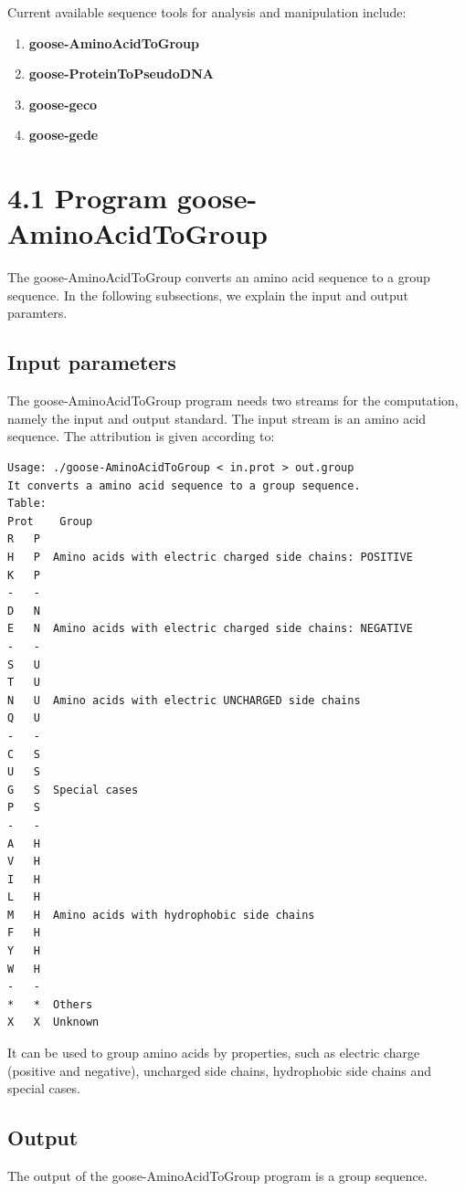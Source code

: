 \documentclass[11pt,journal,compsoc]{report}[1]
\begin{document}
Current available sequence tools for analysis and manipulation include:
\begin{enumerate}
\item \textbf{goose-AminoAcidToGroup}
\item \textbf{goose-ProteinToPseudoDNA}
\item \textbf{goose-geco}
\item \textbf{goose-gede}
\end{enumerate}

\section*{4.1 Program goose-AminoAcidToGroup}

The goose-AminoAcidToGroup converts an amino acid sequence to a group sequence.
In the following subsections, we explain the input and output paramters.

\subsection*{Input parameters}

The goose-AminoAcidToGroup program needs two streams for the computation,
namely the input and output standard. The input stream is an amino acid sequence.
The attribution is given according to:
\begin{lstlisting}
Usage: ./goose-AminoAcidToGroup < in.prot > out.group
It converts a amino acid sequence to a group sequence.
Table:
Prot	Group
R	P
H	P  Amino acids with electric charged side chains: POSITIVE
K	P
-	-
D	N
E	N  Amino acids with electric charged side chains: NEGATIVE
-	-
S	U
T	U
N	U  Amino acids with electric UNCHARGED side chains
Q	U
-	-
C	S
U	S
G	S  Special cases
P	S
-	-
A	H
V	H
I	H
L	H
M	H  Amino acids with hydrophobic side chains
F	H
Y	H
W	H
-	-
*	*  Others
X	X  Unknown
\end{lstlisting}
It can be used to group amino acids by properties, such as electric charge (positive
and negative), uncharged side chains, hydrophobic side chains and special cases.

\subsection*{Output}

The output of the goose-AminoAcidToGroup program is a group sequence.
\end{document}
